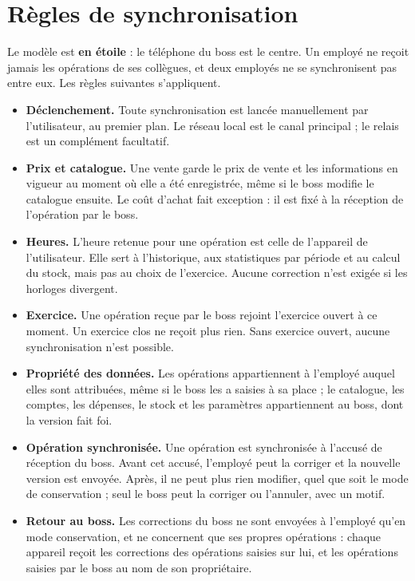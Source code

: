 \documentclass[11pt,a4paper]{article}
\begin{document}
	\section{Règles de synchronisation}
	Le modèle est \textbf{en étoile} : le téléphone du boss est le centre. Un employé ne reçoit jamais les opérations de ses collègues, et deux employés ne se synchronisent pas entre eux. Les règles suivantes s'appliquent.

	\begin{itemize}[leftmargin=*]
		\item \textbf{Déclenchement.} Toute synchronisation est lancée manuellement par l'utilisateur, au premier plan. Le réseau local est le canal principal ; le relais est un complément facultatif.
		\item \textbf{Prix et catalogue.} Une vente garde le prix de vente et les informations en vigueur au moment où elle a été enregistrée, même si le boss modifie le catalogue ensuite. Le coût d'achat fait exception : il est fixé à la réception de l'opération par le boss.
		\item \textbf{Heures.} L'heure retenue pour une opération est celle de l'appareil de l'utilisateur. Elle sert à l'historique, aux statistiques par période et au calcul du stock, mais pas au choix de l'exercice. Aucune correction n'est exigée si les horloges divergent.
		\item \textbf{Exercice.} Une opération reçue par le boss rejoint l'exercice ouvert à ce moment. Un exercice clos ne reçoit plus rien. Sans exercice ouvert, aucune synchronisation n'est possible.
		\item \textbf{Propriété des données.} Les opérations appartiennent à l'employé auquel elles sont attribuées, même si le boss les a saisies à sa place ; le catalogue, les comptes, les dépenses, le stock et les paramètres appartiennent au boss, dont la version fait foi.
		\item \textbf{Opération synchronisée.} Une opération est synchronisée à l'accusé de réception du boss. Avant cet accusé, l'employé peut la corriger et la nouvelle version est envoyée. Après, il ne peut plus rien modifier, quel que soit le mode de conservation ; seul le boss peut la corriger ou l'annuler, avec un motif.
		\item \textbf{Retour au boss.} Les corrections du boss ne sont envoyées à l'employé qu'en mode conservation, et ne concernent que ses propres opérations : chaque appareil reçoit les corrections des opérations saisies sur lui, et les opérations saisies par le boss au nom de son propriétaire.

\end{itemize}
\end{document}
